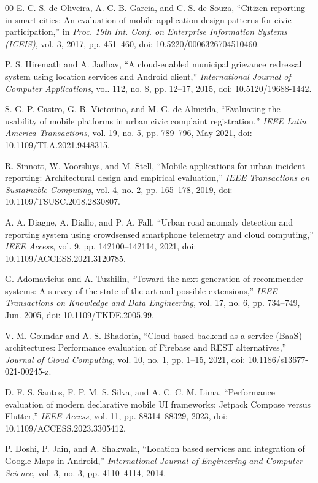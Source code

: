 \documentclass[conference]{IEEEtran}
\begin{document}
\begin{thebibliography}{00}
E. C. S. de Oliveira, A. C. B. Garcia, and C. S. de Souza, ``Citizen reporting in smart cities: An evaluation of mobile application design patterns for civic participation,'' in \textit{Proc. 19th Int. Conf. on Enterprise Information Systems (ICEIS)}, vol. 3, 2017, pp. 451--460, doi: 10.5220/0006326704510460.

P. S. Hiremath and A. Jadhav, ``A cloud-enabled municipal grievance redressal system using location services and Android client,'' \textit{International Journal of Computer Applications}, vol. 112, no. 8, pp. 12--17, 2015, doi: 10.5120/19688-1442.

S. G. P. Castro, G. B. Victorino, and M. G. de Almeida, ``Evaluating the usability of mobile platforms in urban civic complaint registration,'' \textit{IEEE Latin America Transactions}, vol. 19, no. 5, pp. 789--796, May 2021, doi: 10.1109/TLA.2021.9448315.

R. Sinnott, W. Voorsluys, and M. Stell, ``Mobile applications for urban incident reporting: Architectural design and empirical evaluation,'' \textit{IEEE Transactions on Sustainable Computing}, vol. 4, no. 2, pp. 165--178, 2019, doi: 10.1109/TSUSC.2018.2830807.

A. A. Diagne, A. Diallo, and P. A. Fall, ``Urban road anomaly detection and reporting system using crowdsensed smartphone telemetry and cloud computing,'' \textit{IEEE Access}, vol. 9, pp. 142100--142114, 2021, doi: 10.1109/ACCESS.2021.3120785.

G. Adomavicius and A. Tuzhilin, ``Toward the next generation of recommender systems: A survey of the state-of-the-art and possible extensions,'' \textit{IEEE Transactions on Knowledge and Data Engineering}, vol. 17, no. 6, pp. 734--749, Jun. 2005, doi: 10.1109/TKDE.2005.99.

V. M. Goundar and A. S. Bhadoria, ``Cloud-based backend as a service (BaaS) architectures: Performance evaluation of Firebase and REST alternatives,'' \textit{Journal of Cloud Computing}, vol. 10, no. 1, pp. 1--15, 2021, doi: 10.1186/s13677-021-00245-z.

D. F. S. Santos, F. P. M. S. Silva, and A. C. C. M. Lima, ``Performance evaluation of modern declarative mobile UI frameworks: Jetpack Compose versus Flutter,'' \textit{IEEE Access}, vol. 11, pp. 88314--88329, 2023, doi: 10.1109/ACCESS.2023.3305412.

P. Doshi, P. Jain, and A. Shakwala, ``Location based services and integration of Google Maps in Android,'' \textit{International Journal of Engineering and Computer Science}, vol. 3, no. 3, pp. 4110--4114, 2014.


\end{thebibliography}
\end{document}
